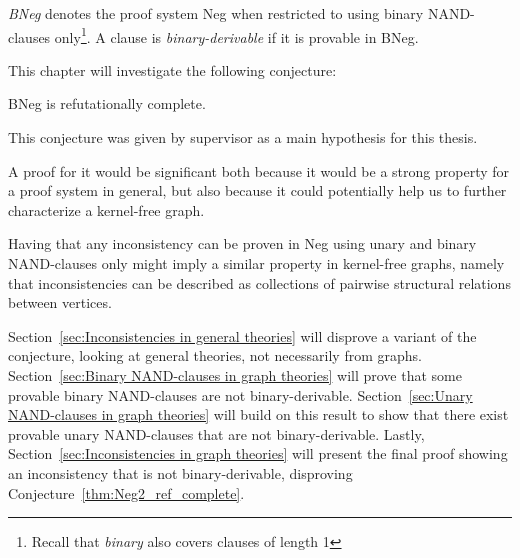 

\begin{definition}
  \textit{BNeg} denotes the proof system Neg when restricted to using binary NAND-clauses only\footnote{Recall that \textit{binary} also covers clauses of length 1}.
  A clause is \textit{binary-derivable} if it is provable in BNeg.
\end{definition}
This chapter will investigate the following conjecture:
\begin{conjecture}
  BNeg is refutationally complete.
  \label{thm:Neg2_ref_complete}
\end{conjecture}
This conjecture was given by supervisor as a main hypothesis for this thesis.

A proof for it would be significant both because it would be a strong property for a proof system in general, but also because it could potentially help us to further characterize a kernel-free graph.

Having that any inconsistency can be proven in Neg using unary and binary NAND-clauses only might imply a similar property in kernel-free graphs, namely that inconsistencies can be described as collections of pairwise structural relations between vertices.

Section~\ref{sec:Inconsistencies in general theories} will disprove a variant of the conjecture, looking at general theories, not necessarily from graphs.
Section~\ref{sec:Binary NAND-clauses in graph theories} will prove that some provable binary NAND-clauses are not binary-derivable.
Section~\ref{sec:Unary NAND-clauses in graph theories} will build on this result to show that there exist provable unary NAND-clauses that are not binary-derivable.
Lastly, Section~\ref{sec:Inconsistencies in graph theories} will present the final proof showing an inconsistency that is not binary-derivable, disproving Conjecture~\ref{thm:Neg2_ref_complete}.
